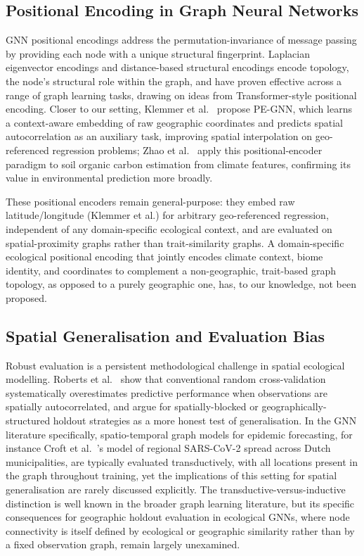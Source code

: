 \documentclass[a4paper,fleqn]{cas-sc}
\begin{document}
\subsection{Positional Encoding in Graph Neural Networks}

GNN positional encodings address the permutation-invariance of message passing by providing each node with a unique structural fingerprint. Laplacian eigenvector encodings \citep{dwivedi2020} and distance-based structural encodings \citep{li2020} encode topology, the node's structural role within the graph, and have proven effective across a range of graph learning tasks, drawing on ideas from Transformer-style positional encoding. Closer to our setting, Klemmer et al.~\citep{klemmer2023pegnn} propose PE-GNN, which learns a context-aware embedding of raw geographic coordinates and predicts spatial autocorrelation as an auxiliary task, improving spatial interpolation on geo-referenced regression problems; Zhao et al.~\citep{zhao2023} apply this positional-encoder paradigm to soil organic carbon estimation from climate features, confirming its value in environmental prediction more broadly.

These positional encoders remain general-purpose: they embed raw latitude/longitude (Klemmer et al.) for arbitrary geo-referenced regression, independent of any domain-specific ecological context, and are evaluated on spatial-proximity graphs rather than trait-similarity graphs. A domain-specific ecological positional encoding that jointly encodes climate context, biome identity, and coordinates to complement a non-geographic, trait-based graph topology, as opposed to a purely geographic one, has, to our knowledge, not been proposed.

\subsection{Spatial Generalisation and Evaluation Bias}

Robust evaluation is a persistent methodological challenge in spatial ecological modelling. Roberts et al.~\citep{roberts2017} show that conventional random cross-validation systematically overestimates predictive performance when observations are spatially autocorrelated, and argue for spatially-blocked or geographically-structured holdout strategies as a more honest test of generalisation. In the GNN literature specifically, spatio-temporal graph models for epidemic forecasting, for instance Croft et al.~\citep{croft2023}'s model of regional SARS-CoV-2 spread across Dutch municipalities, are typically evaluated transductively, with all locations present in the graph throughout training, yet the implications of this setting for spatial generalisation are rarely discussed explicitly. The transductive-versus-inductive distinction is well known in the broader graph learning literature, but its specific consequences for geographic holdout evaluation in ecological GNNs, where node connectivity is itself defined by ecological or geographic similarity rather than by a fixed observation graph, remain largely unexamined.
\end{document}
